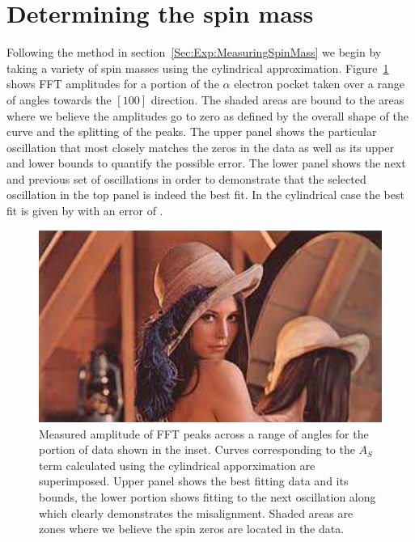 
\section{Determining the spin mass}

Following the method in section~\ref{Sec:Exp:MeasuringSpinMass} we begin by taking a variety of spin masses using the cylindrical approximation. Figure~\ref{Fig:ResD:Band4SpinMassCylindrical} shows \ac{FFT} amplitudes for a portion of the $\alpha$ electron pocket taken over a range of angles towards the $[100]$ direction. The shaded areas are bound to the areas where we believe the amplitudes go to zero as defined by the overall shape of the curve and the splitting of the peaks. The upper panel shows the particular oscillation that most closely matches the zeros in the data as well as its upper and lower bounds to quantify the possible error. The lower panel shows the next and previous set of oscillations in order to demonstrate that the selected oscillation in the top panel is indeed the best fit. In the cylindrical case the best fit is given by  with an error of .
\begin{figure}[htbp]
    \begin{center}
        \includegraphics[scale=0.9]{Misc/TODO}
        \caption{Measured amplitude of \ac{FFT} peaks across a range of angles for the portion of data shown in the inset. Curves corresponding to the $A_S$ term calculated using the cylindrical apporximation are superimposed. Upper panel shows the best fitting data and its bounds, the lower portion shows fitting to the next oscillation along which clearly demonstrates the misalignment. Shaded areas are zones where we believe the spin zeros are located in the data.}
        \label{Fig:ResD:Band4SpinMassCylindrical}
    \end{center}
\end{figure}
